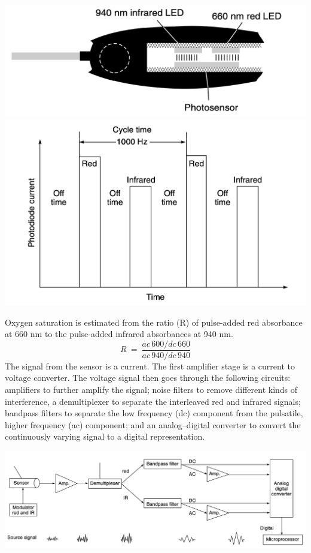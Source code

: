 \documentclass{article}
\begin{document}
\begin{center}
    \includegraphics[scale=0.4]{Screenshot 2023-05-05 at 2.04.01 AM.png}
    \includegraphics[scale=0.4]{Screenshot 2023-05-05 at 2.04.55 AM.png}
\end{center}
Oxygen saturation is estimated from the ratio (R) of pulse-added red absorbance at 660 nm to the pulse-added infrared absorbances at 940 nm.
\begin{equation}
    R \: = \: \frac{ac\, 600 / dc \, 660}{ac \, 940 / dc\, 940}
\end{equation}
The signal from the sensor is a current. The first amplifier stage is a current to voltage converter. The voltage signal then goes through the following circuits: amplifiers to further amplify the signal; noise filters to remove different kinds of interference, a demultiplexer to separate the interleaved red and infrared signals; bandpass filters to separate the low frequency (dc) component from the pulsatile, higher frequency (ac) component; and an analog–digital converter to convert the continuously varying signal to a digital representation.
\\
\begin{center}
    \includegraphics[scale=0.3]{Screenshot 2023-05-05 at 2.09.55 AM.png}
\end{center}
\end{document}
